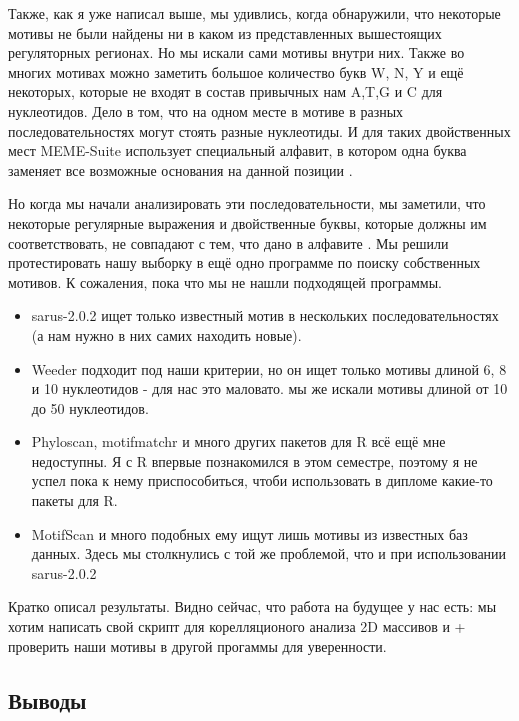 \documentclass[14pt]{extarticle}
\begin{document}
    \par{Также, как я уже написал выше, мы удивлись, когда обнаружили, что некоторые мотивы не были найдены ни в каком 
    из представленных вышестоящих регуляторных регионах. Но мы искали сами мотивы внутри них. Также во многих мотивах 
    можно заметить большое количество букв W, N, Y и ещё некоторых, которые не входят в состав привычных нам A,T,G и C 
    для нуклеотидов. Дело в том, что на одном месте в мотиве в разных последовательностях могут стоять разные 
    нуклеотиды. И для таких двойственных мест MEME-Suite использует специальный алфавит, в котором одна буква заменяет 
    все возможные основания на данной позиции \cite{memealphabet}. }
    
    \par{Но когда мы начали анализировать эти последовательности, мы заметили, что некоторые регулярные выражения и 
    двойственные буквы, которые должны им соответствовать, не совпадают с тем, что дано в алфавите \cite{memealphabet}. 
    Мы решили протестировать нашу выборку в ещё одно программе по поиску собственных мотивов. К сожаления, пока что мы 
    не нашли подходящей программы.
    \begin{itemize}
        \item sarus-2.0.2 ищет только известный мотив в нескольких последовательностях (а нам нужно в них самих находить
        новые). 
        \item Weeder подходит под наши критерии, но он ищет только мотивы длиной 6, 8 и 10 нуклеотидов - для нас это 
        маловато. мы же искали мотивы длиной от 10 до 50 нуклеотидов.
        \item Phyloscan, motifmatchr и много других пакетов для R всё ещё мне недоступны. Я с R впервые познакомился в 
        этом семестре, поэтому я не успел пока к нему приспособиться, чтоби использовать в дипломе какие-то пакеты для 
        R.
        \item MotifScan и много подобных ему ищут лишь мотивы из известных баз данных. Здесь мы столкнулись с той же 
        проблемой, что и при использовании sarus-2.0.2
    \end{itemize}
    }
    
    \par{Кратко описал результаты. Видно сейчас, что работа на будущее у нас есть: мы хотим написать свой скрипт для 
    корелляционого анализа 2D массивов и + проверить наши мотивы в другой прогаммы для уверенности.}
    
\newpage
\begin{center}
\item \section{Выводы}
\end{center}
\end{document}
